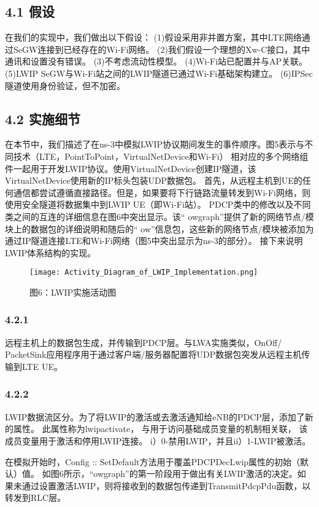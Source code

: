 \subsection*{4.1 假设}
在我们的实现中，我们做出以下假设：
(1)假设采用非并置方案，其中LTE网络通过SeGW连接到已经存在的Wi-Fi网络。
(2)我们假设一个理想的Xw-C接口，其中通讯和设置没有错误。
(3)不考虑流动性模型。
(4)Wi-Fi站已配置并与AP关联。
(5)LWIP SeGW与Wi-Fi站之间的LWIP隧道已通过Wi-Fi基础架构建立。
(6)IPSec隧道使用身份验证，但不加密。

\subsection*{4.2 实施细节}
在本节中，我们描述了在ns-3中模拟LWIP协议期间发生的事件顺序。图5表示与不同技术（LTE，PointToPoint，VirtualNetDevice和Wi-Fi）
相对应的多个网络组件一起用于开发LWIP协议。使用VirtualNetDevice创建IP隧道，该VirtualNetDevice使用新的IP标头包装UDP数据包。
首先，从远程主机到UE的任何通信都尝试遵循直接路径。但是，如果要将下行链路流量转发到Wi-Fi网络，则使用安全隧道将数据集中到LWIP UE（即Wi-Fi站）。
PDCP类中的修改以及不同类之间的互连的详细信息在图6中突出显示。该“ owgraph”提供了新的网络节点/模块上的数据包的详细说明和随后的“ ow”信息包，这些新的网络节点/模块被添加为通过IP隧道连接LTE和Wi-Fi网络（图5中突出显示为ns-3的部分）。
接下来说明LWIP体系结构的实现。

\begin{figure}[htb]
  \centering
  \texttt{[image: Activity\_Diagram\_of\_LWIP\_Implementation.png]}
  \caption*{图6：LWIP实施活动图}
\end{figure}


\subsubsection*{4.2.1}
远程主机上的数据包生成，并传输到PDCP层。与LWA实施类似，OnOff/ PacketSink应用程序用于通过客户端/服务器配置将UDP数据包突发从远程主机传输到LTE UE。

\subsubsection*{4.2.2}
LWIP数据流区分。为了将LWIP的激活或去激活通知给eNB的PDCP层，添加了新的属性。
此属性称为lwipactivate，
与用于访问基础成员变量的机制相关联，
该成员变量用于激活和停用LWIP连接。
i）0-禁用LWIP，并且ii）1-LWIP被激活。

在模拟开始时，Config :: SetDefault方法用于覆盖PDCPDecLwip属性的初始（默认）值。
如图6所示，“owgraph”的第一阶段用于做出有关LWIP激活的决定。如果未通过设置激活LWIP，则将接收到的数据包传递到TransmitPdcpPdu函数，以转发到RLC层。

